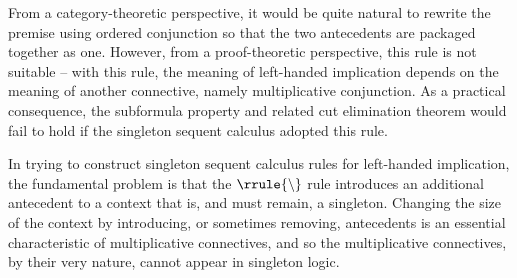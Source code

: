 From a category-theoretic perspective, it would be quite natural to rewrite the premise using ordered conjunction so that the two antecedents are packaged together as one.
% 
However, from a proof-theoretic perspective, this rule is not suitable -- with this rule, the meaning of left-handed implication depends on the meaning of another connective, namely multiplicative conjunction.
As a practical consequence, the subformula property and related cut elimination theorem would fail to hold if the singleton sequent calculus adopted this rule.

In trying to construct singleton sequent calculus rules for left-handed implication, the fundamental problem is that the $\rrule{\limp}$ rule introduces an additional antecedent to a context that is, and must remain, a singleton.
Changing the size of the context by introducing, or sometimes removing, antecedents is an essential characteristic of multiplicative connectives, and so the multiplicative connectives, by their very nature, cannot appear in singleton logic.










